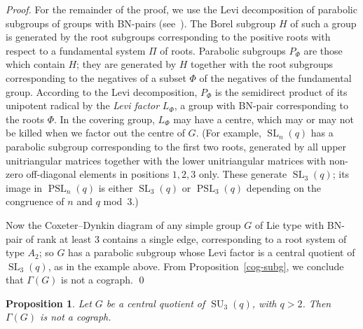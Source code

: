\documentclass{elsarticle}
\newtheorem{prop}[theorem]{Proposition}
\newcommand{\PSL}{\mathop{\mathrm{PSL}}\nolimits}
\newcommand{\SL}{\mathop{\mathrm{SL}}\nolimits}
\newcommand{\SU}{\mathop{\mathrm{SU}}\nolimits}
\begin{document}
\begin{proof}
For the remainder of the proof, we use the Levi decomposition of parabolic
subgroups of groups with BN-pairs (see~\cite[Section 8.5]{Carter}).
The Borel subgroup $H$ of such a group is generated by the root subgroups
corresponding to the positive roots with respect to a fundamental system
$\Pi$ of roots. Parabolic subgroups $P_\Phi$ are those which contain $H$; they
are generated by $H$ together with the root subgroups corresponding to the
negatives of a subset $\Phi$ of the negatives of the fundamental group.
According to the Levi decomposition, $P_\Phi$ is the semidirect product
of its unipotent radical by the \emph{Levi factor} $L_\Phi$, a group with
BN-pair corresponding to the roots $\Phi$.
In the covering group, $L_\Phi$ may have a centre, which may or may not be
killed when we factor out the centre of $G$. (For example, $\SL_n(q)$ has a
parabolic subgroup corresponding to the first two roots, generated by all
upper unitriangular matrices together with the lower unitriangular matrices
with non-zero off-diagonal elements in positions $1,2,3$ only. These generate
$\SL_3(q)$; its image in $\PSL_n(q)$ is either $\SL_3(q)$ or $\PSL_3(q)$
depending on the congruence of $n$ and $q$ mod~$3$.)

Now the Coxeter--Dynkin diagram of any simple group $G$ of Lie type with
BN-pair of rank at  least $3$ contains a single edge, corresponding to a root
system of type $A_2$; so $G$ has a parabolic
subgroup whose Levi factor is a central quotient of $\SL_3(q)$, as in the
example above. From Proposition~\ref{cog-subg},
we conclude that $\Gamma(G)$ is not a cograph. \qed
\end{proof}

\begin{prop}\label{Thm_SU_3}
Let $G$ be a central quotient of $\SU_3(q)$, with $q>2$. Then $\Gamma(G)$ is
not a cograph.
\end{prop}
\end{document}
